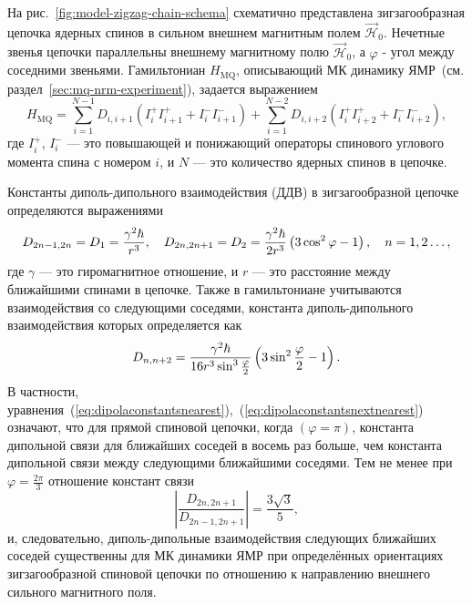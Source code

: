 На рис.~\ref{fig:model-zigzag-chain-schema} схематично представлена
зигзагообразная цепочка ядерных спинов в сильном внешнем магнитным полем $\vec{\mathcal H}_0$.
Нечетные звенья цепочки параллельны внешнему магнитному полю $\vec{\mathcal H}_0$,
а $\varphi$ - угол между соседними звеньями.
Гамильтониан $H_\mathrm{MQ}$,
описывающий МК динамику ЯМР~(см. раздел~\ref{sec:mq-nrm-experiment}),
задается выражением~\cite{Doronin2000}
%
\begin{equation}\label{hmqnextnearest}
 H_\mathrm{MQ} = \sum_{i=1}^{N-1} D_{i, i+1}(I_i^{+}I_{i+1}^{+}+ I_i^{-}I_{i+1}^{-} )
   + \sum_{i=1}^{N-2} D_{i, i+2}(I_i^{+}I_{i+2}^{+}+ I_i^{-}I_{i+2}^{-} ) ,
\end{equation}
%
где $I_i^+$, $I_i^-$ --- это повышающей и понижающий операторы спинового углового момента спина с номером $i$,
и $N$ --- это количество ядерных спинов в цепочке.

Константы диполь-дипольного взаимодействия (ДДВ)
в зигзагообразной цепочке определяются выражениями~\cite{Abragam1982}
%
\begin{equation}\label{eq:dipolaconstantsnearest}
  D_{2n-1, 2n} = D_1 =\dfrac{\gamma^2\hbar }{r^3},
  \quad
  D_{2n, 2n+1} = D_2=\dfrac{\gamma^2\hbar }{2r^3}\left( 3\cos^2 \varphi -1 \right),
  \quad
  n=1,2\dots,
\end{equation}
где $\gamma$ --- это гиромагнитное отношение,
и $r$ --- это расстояние между ближайшими спинами в цепочке.
Также в гамильтониане учитываются взаимодействия со следующими соседями,
константа диполь-дипольного взаимодействия которых определяется как~\cite{Abragam1982}
%
\begin{equation}\label{eq:dipolaconstantsnextnearest}
  D_{n, n+2}=\dfrac{\gamma^2\hbar }{16r^3 \sin^3 \frac{\varphi}{2}}\left( 3\sin^2 \frac{\varphi}{2} -1 \right).
\end{equation}
%
В частности, уравнения~(\ref{eq:dipolaconstantsnearest}),~(\ref{eq:dipolaconstantsnextnearest}) означают,
что для прямой спиновой цепочки, когда  $(\varphi=\pi)$,
константа дипольной связи для ближайших соседей в восемь раз больше,
чем константа дипольной связи между следующими ближайшими соседями.
Тем не менее при $\varphi=\frac{2\pi}{3}$ отношение констант связи
\begin{equation}
  \left|\dfrac{D_{2n, 2n+1}}{D_{2n-1, 2n+1}}\right| = \dfrac{3\sqrt{3}}{5},
\end{equation}
и, следовательно,
диполь-дипольные взаимодействия следующих ближайших соседей
существенны для МК динамики ЯМР при определённых ориентациях зигзагообразной спиновой цепочки
по отношению к направлению внешнего сильного магнитного поля.



